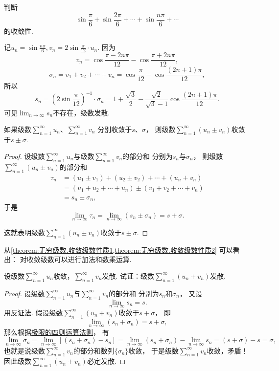 \begin{example}
判断\[
\sin\frac{\pi}{6}+\sin\frac{2\pi}{6}+\dotsb+\sin\frac{n\pi}{6}+\dotsb
\]的收敛性.
\begin{solution}
记\(u_n = \sin\frac{n\pi}{6},
v_n = 2\sin\frac{\pi}{12} \cdot u_n\).
因为\[
	v_n = \cos\frac{\pi-2n\pi}{12} - \cos\frac{\pi+2n\pi}{12},
\]\[
	\sigma_n
	= v_1 + v_2 + \dotsb + v_n
	= \cos\frac{\pi}{12} - \cos\frac{(2n+1)\pi}{12},
\]
所以\[
	s_n
	= \left(2\sin\frac{\pi}{12}\right)^{-1} \cdot \sigma_n
	= 1+\frac{\sqrt{3}}{2} - \frac{\sqrt{2}}{\sqrt{3}-1} \cos\frac{(2n+1)\pi}{12}.
\]
可见\(\lim_{n\to\infty} s_n\)不存在，级数发散.
\end{solution}
\end{example}

\begin{property}\label{theorem:无穷级数.收敛级数性质2}
如果级数\(\sum_{n=1}^\infty u_n\)、\(\sum_{n=1}^\infty v_n\)
分别收敛于\(s\)、\(\sigma\)，
则级数\(\sum_{n=1}^\infty(u_n \pm v_n)\)收敛于\(s \pm \sigma\).
\begin{proof}
设级数\(\sum_{n=1}^\infty u_n\)与级数\(\sum_{n=1}^\infty v_n\)的部分和
分别为\(s_n\)与\(\sigma_n\)，
则级数\(\sum_{n=1}^\infty(u_n \pm v_n)\)的部分和\begin{align*}
	\tau_n &= (u_1 \pm v_1) + (u_2 \pm v_2) + \dotsb + (u_n + v_n) \\
	&= (u_1 + u_2 + \dotsb + u_n) \pm (v_1 + v_2 + \dotsb + v_n) \\
	&= s_n \pm \sigma_n,
\end{align*}
于是\[
	\lim_{n\to\infty} \tau_n
	= \lim_{n\to\infty} (s_n \pm \sigma_n)
	= s + \sigma.
\]

这就表明级数\(\sum_{n=1}^\infty(u_n \pm v_n)\)收敛于\(s \pm \sigma\).
\end{proof}
\end{property}
\begin{remark}
从\cref{theorem:无穷级数.收敛级数性质1,theorem:无穷级数.收敛级数性质2} 可以看出：
对收敛级数可以进行加法和数乘运算.
\end{remark}

\begin{example}
设级数\(\sum_{n=1}^\infty u_n\)收敛，\(\sum_{n=1}^\infty v_n\)发散.
试证：级数\(\sum_{n=1}^\infty (u_n + v_n)\)发散.
\begin{proof}
设级数\(\sum_{n=1}^\infty u_n\)与\(\sum_{n=1}^\infty v_n\)的部分和
分别为\(s_n\)和\(\sigma_n\)，
又设\[
	\lim_{n\to\infty} s_n = s.
\]
用反证法.
假设级数\(\sum_{n=1}^\infty (u_n + v_n)\)收敛于\(s + \sigma\)，
即\[
	\lim_{n\to\infty} (s_n + \sigma_n) = s+\sigma,
\]
那么根据\hyperref[theorem:极限.极限的四则运算法则]{极限的四则运算法则}，
有\[
	\lim_{n\to\infty} \sigma_n
	= \lim_{n\to\infty} [(s_n + \sigma_n) - s_n]
	= \lim_{n\to\infty} (s_n + \sigma_n) - \lim_{n\to\infty} s_n
	= (s + \sigma) - s
	= \sigma,
\]
也就是说级数\(\sum_{n=1}^\infty v_n\)的部分和数列\(\{\sigma_n\}\)收敛，
于是级数\(\sum_{n=1}^\infty v_n\)收敛，矛盾！
因此级数\(\sum_{n=1}^\infty (u_n + v_n)\)必定发散.
\end{proof}
\end{example}

